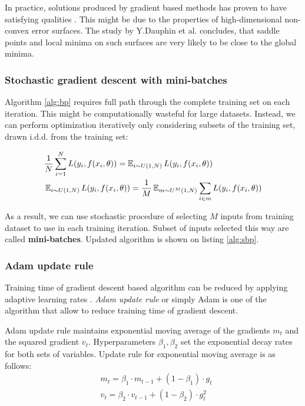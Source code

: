In practice, solutions produced by gradient based methods has proven to have satisfying qualities \cite{Szegedy2016,He2015}.
This might be due to the properties of high-dimensional non-convex error surfaces. The study by Y.Dauphin et al. \cite{Dauphin14} concludes, that saddle points and local minima on such surfaces are very likely to be close to the global minima.

\subsubsection{Stochastic gradient descent with mini-batches}

Algorithm \ref{alg:bp} requires full path through the complete training set on each iteration.
This might be computationally wasteful for large datasets. Instead, we can perform optimization iteratively only considering subsets of the training set, drawn i.d.d. from the training set:

\begin{equation*}\label{eq:sopt}
  \begin{aligned}
  & \frac{1}{N} \sum_{i=1}^{N} L(y_i, f(x_i, \theta)) = \operatorname{\mathbb{E}}_{i \sim U(1,N) } L(y_i, f(x_i, \theta)) \\
  & \operatorname{\mathbb{E}}_{i \sim U(1,N) } L(y_i, f(x_i, \theta))= \frac{1}{M} \operatorname{\mathbb{E}}_{m \sim U^M(1,N) } \sum_{i \in m} L(y_i, f(x_i, \theta))
  \end{aligned}
\end{equation*}

As a result, we can use stochastic procedure of selecting $M$ inputs from training dataset to use in each training iteration.
Subset of inputs selected this way are called \textbf{mini-batches}. Updated algorithm is shown on listing \ref{alg:sbp}.



\subsubsection{Adam update rule}

Training time of gradient descent based algorithm can be reduced by applying adaptive learning rates \cite{Kingma2015}.
\textit{Adam update rule} or simply Adam is one of the algorithm that allow to reduce training time of gradient descent.

Adam update rule maintains exponential moving average of the gradients $m_t$ and the squared gradient $v_t$.
Hyperparameters $\beta_1, \beta_2$ set the exponential decay rates for both sets of variables.
Update rule for exponential moving average is as follows:
\begin{equation*}
  \begin{aligned}
    & m_t = \beta_1 \cdot m_{t-1} + (1-\beta_1) \cdot g_t \\
    & v_t = \beta_2 \cdot v_{t-1} + (1-\beta_2) \cdot g_t^2
  \end{aligned}
\end{equation*}

